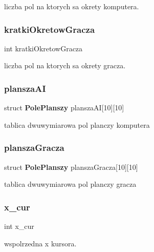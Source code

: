 liczba pol na ktorych sa okrety komputera. 

\mbox{\label{znaki_8c_a4fcac5248e9a132f00cd666977e52fcb}} 
\subsubsection{kratki\+Okretow\+Gracza}
{\footnotesize\ttfamily int kratki\+Okretow\+Gracza}



liczba pol na ktorych sa okrety gracza. 

\mbox{\label{znaki_8c_a1f234b351363f40911dd7bc7b8e4ae5c}} 
\subsubsection{plansza\+AI}
{\footnotesize\ttfamily struct \textbf{ Pole\+Planszy} plansza\+AI[10][10]}



tablica dwuwymiarowa pol planczy komputera 

\mbox{\label{znaki_8c_a242928f362000aa6cb465df03482b58f}} 
\subsubsection{plansza\+Gracza}
{\footnotesize\ttfamily struct \textbf{ Pole\+Planszy} plansza\+Gracza[10][10]}



tablica dwuwymiarowa pol planczy gracza 

\mbox{\label{znaki_8c_a13fe9210eae1784cee7b005356ff129c}} 
\subsubsection{x\+\_\+cur}
{\footnotesize\ttfamily int x\+\_\+cur}



wspolrzedna x kursora. 

\mbox{\label{znaki_8c_a353801f530f676971e5bd797371e7164}} 
